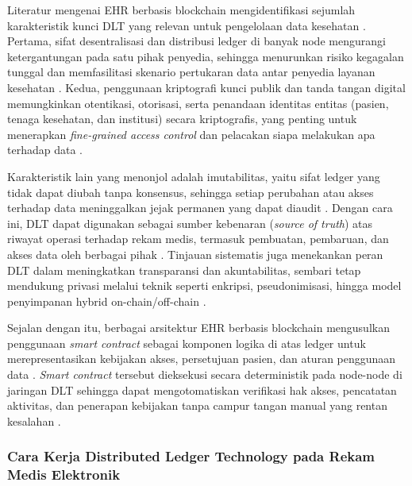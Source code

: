 Literatur mengenai EHR berbasis blockchain mengidentifikasi sejumlah karakteristik kunci DLT yang relevan untuk pengelolaan data kesehatan \parencite{Ettaloui_2024_blockchain_ehr_slr,Mayer_2020_ehr_blockchain_slr}. 
Pertama, sifat desentralisasi dan distribusi ledger di banyak node mengurangi ketergantungan pada satu pihak penyedia, sehingga menurunkan risiko kegagalan tunggal dan memfasilitasi skenario pertukaran data antar penyedia layanan kesehatan \parencite{Mayer_2020_ehr_blockchain_slr}. 
Kedua, penggunaan kriptografi kunci publik dan tanda tangan digital memungkinkan otentikasi, otorisasi, serta penandaan identitas entitas (pasien, tenaga kesehatan, dan institusi) secara kriptografis, yang penting untuk menerapkan \emph{fine-grained access control} dan pelacakan siapa melakukan apa terhadap data \parencite{Ettaloui_2024_blockchain_ehr_slr,Yang_2021_blockchain_architecture_ehr}. 

Karakteristik lain yang menonjol adalah imutabilitas, yaitu sifat ledger yang tidak dapat diubah tanpa konsensus, sehingga setiap perubahan atau akses terhadap data meninggalkan jejak permanen yang dapat diaudit \parencite{Ettaloui_2024_blockchain_ehr_slr,Mayer_2020_ehr_blockchain_slr}. 
Dengan cara ini, DLT dapat digunakan sebagai sumber kebenaran (\emph{source of truth}) atas riwayat operasi terhadap rekam medis, termasuk pembuatan, pembaruan, dan akses data oleh berbagai pihak \parencite{Yang_2021_blockchain_architecture_ehr}. 
Tinjauan sistematis juga menekankan peran DLT dalam meningkatkan transparansi dan akuntabilitas, sembari tetap mendukung privasi melalui teknik seperti enkripsi, pseudonimisasi, hingga model penyimpanan hybrid on-chain/off-chain \parencite{Mayer_2020_ehr_blockchain_slr,Ettaloui_2024_blockchain_ehr_slr}. 

Sejalan dengan itu, berbagai arsitektur EHR berbasis blockchain mengusulkan penggunaan \emph{smart contract} sebagai komponen logika di atas ledger untuk merepresentasikan kebijakan akses, persetujuan pasien, dan aturan penggunaan data \parencite{Yang_2021_blockchain_architecture_ehr,Rawat2025_Blockchain_Secure_EHR}. 
\emph{Smart contract} tersebut dieksekusi secara deterministik pada node-node di jaringan DLT sehingga dapat mengotomatiskan verifikasi hak akses, pencatatan aktivitas, dan penerapan kebijakan tanpa campur tangan manual yang rentan kesalahan \parencite{Yang_2021_blockchain_architecture_ehr}. 

\subsubsection{Cara Kerja Distributed Ledger Technology pada Rekam Medis Elektronik}

